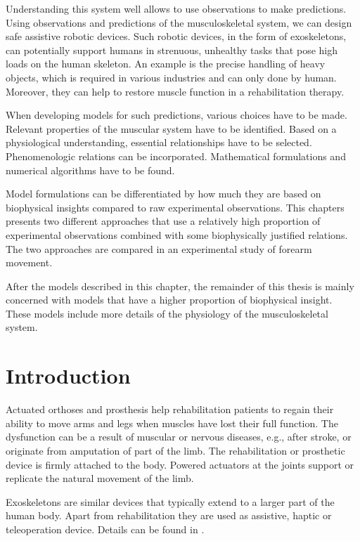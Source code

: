 Understanding this system well allows to use observations to make predictions.
Using observations and predictions of the musculoskeletal system, we can design safe assistive robotic devices.
Such robotic devices, in the form of exoskeletons, can potentially support humans in strenuous, unhealthy tasks that pose high loads on the human skeleton. An example is the precise handling of heavy objects, which is required in various industries and can only done by human. Moreover, they can help to restore muscle function in a rehabilitation therapy.

When developing models for such predictions, various choices have to be made. 
Relevant properties of the muscular system have to be identified. Based on a physiological understanding, essential relationships have to be selected. Phenomenologic relations can be incorporated. Mathematical formulations and numerical algorithms have to be found.

Model formulations can be differentiated by how much they are based on biophysical insights compared to raw experimental observations. This chapters presents two different approaches that use a relatively high proportion of experimental observations combined with some biophysically justified relations. The two approaches are compared in an experimental study of forearm movement. 

After the models described in this chapter, the remainder of this thesis is mainly concerned with models that have a higher proportion of biophysical insight. These models include more details of the physiology of the musculoskeletal system.

\section{Introduction}
Actuated orthoses and prosthesis help rehabilitation patients to regain their ability to move arms and legs when muscles have lost their full function. The dysfunction can be a result of muscular or nervous diseases, e.g., after stroke, or originate from amputation of part of the limb. 
The rehabilitation or prosthetic device is firmly attached to the body. Powered actuators at the joints support or replicate the natural movement of the limb. 

Exoskeletons are similar devices that typically extend to a larger part of the human body. Apart from rehabilitation they are used as assistive, haptic or teleoperation device. Details can be found in \cite{Perry2007}.

